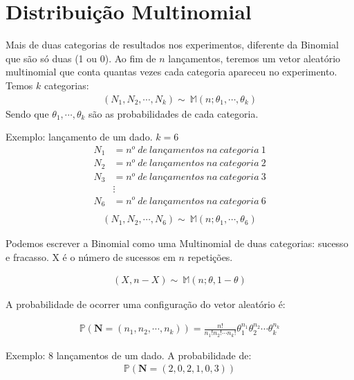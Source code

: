 \documentclass[11pt,a4paper]{article}
\begin{document}
		\section{Distribuição Multinomial}
		
		Mais de duas categorias de resultados nos experimentos, diferente da Binomial que são só duas (1 ou 0).
		Ao fim de $n$ lançamentos, teremos um vetor aleatório multinomial que conta quantas vezes cada categoria apareceu no experimento.
		Temos $k$ categorias:
		\begin{align*}
			(N_1,N_2,\cdots,N_k)\sim~\mathbb{M}(n;\theta_1,\cdots,\theta_k)
		\end{align*}
		Sendo que $\theta_1,\cdots,\theta_k$ são as probabilidades de cada categoria.
		
		Exemplo: lançamento de um dado.
		$k=6$
		\begin{align*}
			N_1&=n^o~de~lançamentos~na~categoria~1\\
			N_2&=n^o~de~lançamentos~na~categoria~2\\
			N_3&=n^o~de~lançamentos~na~categoria~3\\
			&\vdots \\
			N_6&=n^o~de~lançamentos~na~categoria~6\\
		\end{align*}
		\begin{align*}
			(N_1,N_2,\cdots,N_6)\sim~\mathbb{M}(n;\theta_1,\cdots,\theta_6)
		\end{align*}
		
		Podemos escrever a Binomial como uma Multinomial de duas categorias: sucesso e fracasso.
		X é o número de sucessos em $n$ repetições.
		
		\begin{align*}
			(X,n-X)\sim~\mathbb{M}(n;\theta,1-\theta)
		\end{align*}
		
		A probabilidade de ocorrer uma configuração do vetor aleatório é:
		
		\begin{align}
			\mathbb{P}(\textbf{N}=(n_1,n_2,\cdots,n_k))=\frac{n!}{n_1!n_2!\cdots n_k!}\theta_{1}^{n_1}\theta_{2}^{n_2}\cdots\theta_{k}^{n_k}
			\label{eq:eq1}
		\end{align}
		
		Exemplo:
		8 lançamentos de um dado.
		A probabilidade de:
		\begin{align*}
			\mathbb{P}(\textbf{N}=(2,0,2,1,0,3))
		\end{align*}
		
\end{document}
